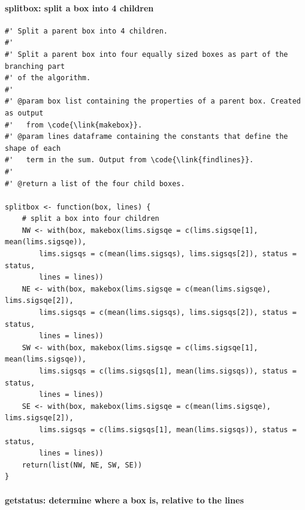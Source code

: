 \documentclass[ejs]{imsart}
\newcommand{\textcompute}{\textsf}
\begin{document}
\paragraph{\textcompute{splitbox}: split a box into 4 children}

\begin{verbatim}
#' Split a parent box into 4 children.
#'
#' Split a parent box into four equally sized boxes as part of the branching part
#' of the algorithm.
#'
#' @param box list containing the properties of a parent box. Created as output
#'   from \code{\link{makebox}}.
#' @param lines dataframe containing the constants that define the shape of each
#'   term in the sum. Output from \code{\link{findlines}}.
#'
#' @return a list of the four child boxes.

splitbox <- function(box, lines) {
    # split a box into four children
    NW <- with(box, makebox(lims.sigsqe = c(lims.sigsqe[1], mean(lims.sigsqe)),
        lims.sigsqs = c(mean(lims.sigsqs), lims.sigsqs[2]), status = status,
        lines = lines))
    NE <- with(box, makebox(lims.sigsqe = c(mean(lims.sigsqe), lims.sigsqe[2]),
        lims.sigsqs = c(mean(lims.sigsqs), lims.sigsqs[2]), status = status,
        lines = lines))
    SW <- with(box, makebox(lims.sigsqe = c(lims.sigsqe[1], mean(lims.sigsqe)),
        lims.sigsqs = c(lims.sigsqs[1], mean(lims.sigsqs)), status = status,
        lines = lines))
    SE <- with(box, makebox(lims.sigsqe = c(mean(lims.sigsqe), lims.sigsqe[2]),
        lims.sigsqs = c(lims.sigsqs[1], mean(lims.sigsqs)), status = status,
        lines = lines))
    return(list(NW, NE, SW, SE))
}
\end{verbatim}

\paragraph{\textcompute{getstatus}: determine where a box is, relative to the lines}
\end{document}
